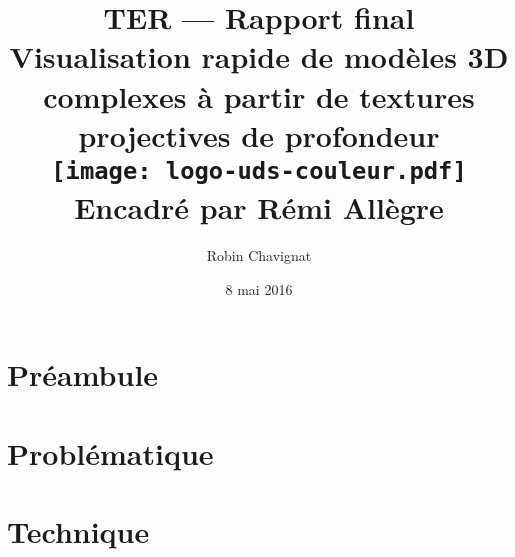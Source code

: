 \documentclass[12pt,twoside]{report}
\begin{document}
\title{
    {TER --- Rapport final}\\
    {Visualisation rapide de modèles 3D complexes à partir de textures projectives de profondeur}\\
    {\texttt{[image: logo-uds-couleur.pdf]}}\\ %
    {Encadré par Rémi Allègre}
}
\author{Robin Chavignat}
\date{8 mai 2016}
\maketitle
\renewcommand*\contentsname{Table des matières}
\tableofcontents

\chapter{Préambule}



\pagebreak

\chapter{Problématique}



\pagebreak

\chapter{Technique}



\pagebreak



\end{document}

